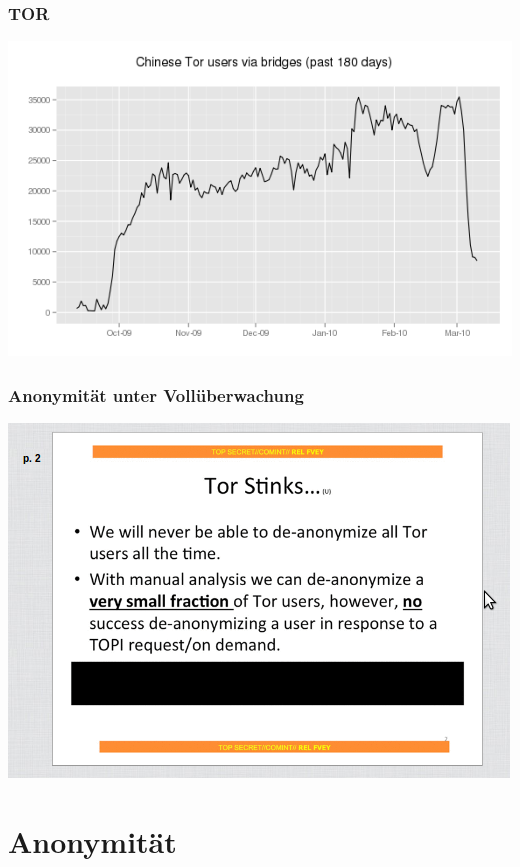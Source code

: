 \documentclass[12pt]{beamer}
\begin{document}
\begin{frame}
    \frametitle{TOR}
    \includegraphics[height=0.7\textheight]{img/bridge2.png}
\end{frame}

\begin{frame}
    \frametitle{Anonymität unter Vollüberwachung}
    \includegraphics[height=0.7\textheight]{img/torstinks.png}
\end{frame}

\section{Anonymität}
\subsection{}
\end{document}
